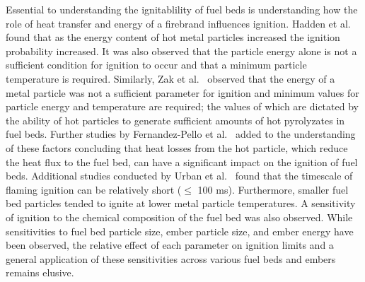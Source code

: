     Essential to understanding the ignitablility of fuel beds is understanding how the role of heat transfer and energy of a firebrand influences ignition. Hadden et al.~\cite{Hadden2011} found that as the energy content of hot metal particles increased the ignition probability increased. It was also observed that the particle energy alone is not a sufficient condition for ignition to occur and that a minimum particle temperature is required. Similarly, Zak et al.~\cite{Zak2014} observed that the energy of a metal particle was not a sufficient parameter for ignition and minimum values for particle energy and temperature are required; the values of which are dictated by the ability of hot particles to generate sufficient amounts of hot pyrolyzates in fuel beds. Further studies by Fernandez-Pello et al.~\cite{Fernandez-Pello2015} added to the understanding of these factors concluding that heat losses from the hot particle, which reduce the heat flux to the fuel bed, can have a significant impact on the ignition of fuel beds. Additional studies conducted by Urban et al.~\cite{Urban2017, Urban2018} found that the timescale of flaming ignition can be relatively short ($\le$ 100 ms).  Furthermore, smaller fuel bed particles tended to ignite at lower metal particle temperatures. A sensitivity of ignition to the chemical composition of the fuel bed was also observed. While sensitivities to fuel bed particle size, ember particle size, and ember energy have been observed, the relative effect of each parameter on ignition limits and a general application of these sensitivities across various fuel beds and embers remains elusive. 
    
